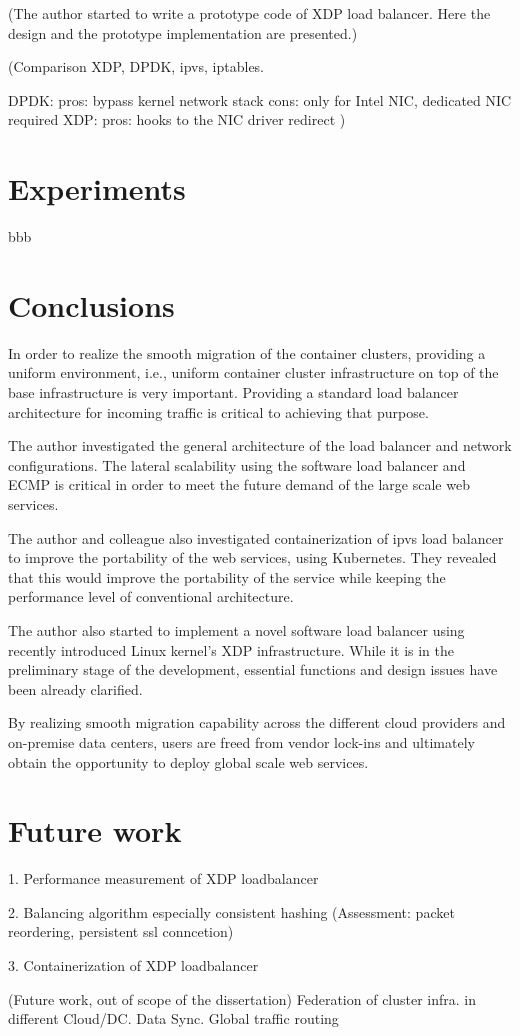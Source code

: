 (The author started to write a prototype code of XDP load balancer.
Here the design and the prototype implementation are presented.)

(Comparison XDP, DPDK, ipvs, iptables.

DPDK: pros: bypass kernel network stack cons: only for Intel NIC, dedicated NIC required
XDP: pros: hooks to the NIC driver redirect
)

\section{Experiments}\label{Experiments}

bbb

\section{Conclusions}\label{Conclusions}

In order to realize the smooth migration of the container clusters, providing a uniform environment, i.e., uniform container cluster infrastructure on top of the base infrastructure is very important.
Providing a standard load balancer architecture for incoming traffic is critical to achieving that purpose.

The author investigated the general architecture of the load balancer and network configurations.
The lateral scalability using the software load balancer and ECMP is critical in order to meet the future demand of the large scale web services.

The author and colleague also investigated containerization of ipvs load balancer to improve the portability of the web services, using Kubernetes.
They revealed that this would improve the portability of the service while keeping the performance level of conventional architecture.

The author also started to implement a novel software load balancer using recently introduced Linux kernel's XDP infrastructure. While it is in the preliminary stage of the development, essential functions and design issues have been already clarified.

By realizing smooth migration capability across the different cloud providers and on-premise data centers, users are freed from vendor lock-ins and ultimately obtain the opportunity to deploy global scale web services.


\section{Future work}\label{Future work}

1. Performance measurement of XDP loadbalancer

2. Balancing algorithm especially consistent hashing
(Assessment: packet reordering, persistent ssl conncetion)
 
3. Containerization of XDP loadbalancer


(Future work, out of scope of the dissertation)
Federation of cluster infra. in different Cloud/DC.
Data Sync.
Global traffic routing

